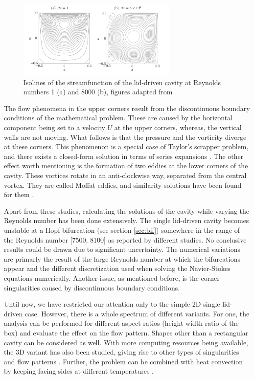 \begin{figure}[ht!]
\begin{center}
  \includegraphics[width=0.7\textwidth]{figs/fig_kuhlmann2019}
\end{center}
\caption{Isolines of the streamfunction of the lid-driven cavity at Reynolds
  numbers 1 (a) and 8000 (b), figures adapted from \cite{kuhlmann2019}}
\label{fig:Re_cav_simple}
\end{figure}

The flow phenomena in the upper corners result from the discontinuous boundary
conditions of the mathematical problem. These are caused by the horizontal
component being set to a velocity $U$ at the upper corners, whereas, the
vertical walls are not moving. What follows is that the pressure and the
vorticity diverge at these corners. This phenomenon is a special case of
Taylor's scrapper problem, and there exists a closed-form solution in terms of
series expansions \citep{kuhlmann2019}. The other effect worth mentioning is
the formation of two eddies at the lower corners of the cavity. These vortices
rotate in an anti-clockwise way, separated from the central vortex. They are
called Moffat eddies, and similarity solutions have been found for them
\citep{moffatt1964}.

Apart from these studies, calculating the solutions of the cavity while varying
the Reynolds number has been done extensively. The single lid-driven cavity
becomes unstable at a Hopf bifurcation (see section \ref{sec:bif}) somewhere in
the range of the Reynolds number [7500, 8100] \citep{kuhlmann2019} as reported
by different studies. No conclusive results could be drawn due to significant
uncertainty. The numerical variations are primarly the result of the large
Reynolds number at which the bifurcations appear and the different
discretization used when solving the Navier-Stokes equations numerically.
Another issue, as mentioned before, is the corner singularities caused by
discontinuous boundary conditions.

Until now, we have restricted our attention only to the simple 2D single
lid-driven case. However, there is a whole spectrum of different variants. For
one, the analysis can be performed for different aspect ratios (height-width
ratio of the box) and evaluate the effect on the flow pattern. Shapes other
than a rectangular cavity can be considered as well. With more computing
resources being available, the 3D variant has also been studied, giving rise to
other types of singularities and flow patterns \citep{lopez2017}. Further, the
problem can be combined with heat convection by keeping facing sides at
different temperatures \citep{koseff1985}. \\

